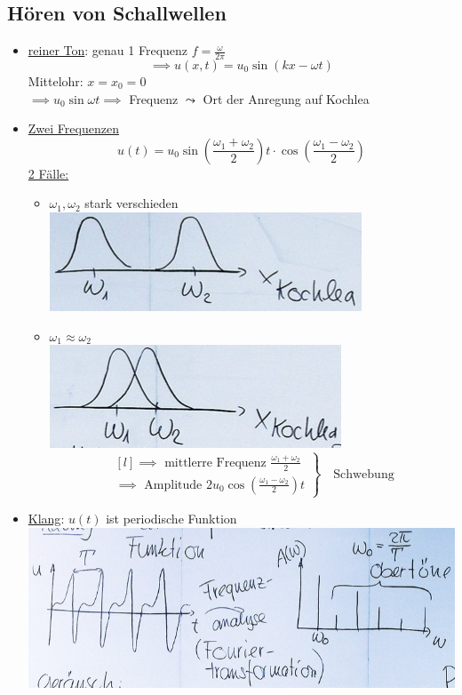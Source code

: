 \subsection{Hören von Schallwellen}
\begin{itemize}
	\item \uline{reiner Ton}: genau 1 Frequenz $f = \frac{\omega}{2\pi}$
		\[ \implies u( x , t ) = u_0 \sin( kx - \omega t ) \]
		Mittelohr: $x = x_0 = 0$ \\
		$\implies u_0 \sin \omega t \implies$ Frequenz $\rightcurvedarrow$ Ort der Anregung auf Kochlea
	\item \uline{Zwei Frequenzen}
		\[ u(t) = u_0 \sin\left( \frac{\omega_1 + \omega_2}{2} \right ) t \cdot \cos\left( \frac{\omega_1 - \omega_2}{2} \right) \]
		\uline{2 Fälle:}
		\begin{itemize}
			\item $\omega_1 , \omega_2$ stark verschieden \\
				\includegraphics{Bild234}
			\item $\omega_1 \approx \omega_2$ \\
				\includegraphics{Bild235}
				\[ \left. \begin{matrix*}[l]
					\implies \text{ mittlerre Frequenz } \frac{\omega_1 + \omega_2}{2} \\
					\implies \text{ Amplitude } 2 u_0 \cos\left( \frac{\omega_1 - \omega_2}{2} \right) t
					\end{matrix*} \right\} \quad \text{Schwebung}
				\]
		\end{itemize}
	\item \uline{Klang}: $u(t)$ ist periodische Funktion \\
		\includegraphics{Bild236}

\end{itemize}
